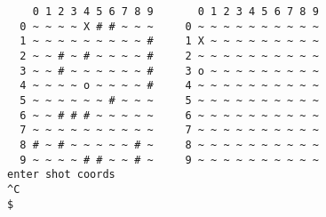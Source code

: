 \documentclass[12pt]{article}
\begin{document}
\begin{lstlisting}
    0 1 2 3 4 5 6 7 8 9       0 1 2 3 4 5 6 7 8 9                               
  0 ~ ~ ~ ~ X # # ~ ~ ~     0 ~ ~ ~ ~ ~ ~ ~ ~ ~ ~                               
  1 ~ ~ ~ ~ ~ ~ ~ ~ ~ #     1 X ~ ~ ~ ~ ~ ~ ~ ~ ~                               
  2 ~ ~ # ~ # ~ ~ ~ ~ #     2 ~ ~ ~ ~ ~ ~ ~ ~ ~ ~                               
  3 ~ ~ # ~ ~ ~ ~ ~ ~ #     3 o ~ ~ ~ ~ ~ ~ ~ ~ ~                               
  4 ~ ~ ~ ~ o ~ ~ ~ ~ #     4 ~ ~ ~ ~ ~ ~ ~ ~ ~ ~                               
  5 ~ ~ ~ ~ ~ ~ # ~ ~ ~     5 ~ ~ ~ ~ ~ ~ ~ ~ ~ ~                               
  6 ~ ~ # # # ~ ~ ~ ~ ~     6 ~ ~ ~ ~ ~ ~ ~ ~ ~ ~                               
  7 ~ ~ ~ ~ ~ ~ ~ ~ ~ ~     7 ~ ~ ~ ~ ~ ~ ~ ~ ~ ~                               
  8 # ~ # ~ ~ ~ ~ ~ # ~     8 ~ ~ ~ ~ ~ ~ ~ ~ ~ ~                               
  9 ~ ~ ~ ~ # # ~ ~ # ~     9 ~ ~ ~ ~ ~ ~ ~ ~ ~ ~                               
enter shot coords
^C
$ 
\end{lstlisting}
\end{document}
